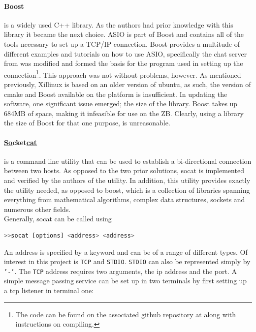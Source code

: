 \paragraph*{Boost}is a widely used C++ library.
As the authors had prior knowledge with this library it became the next choice.
ASIO is part of Boost and contains all of the tools necessary to set up a TCP/IP connection.
Boost provides a multitude of different examples and tutorials on how to use ASIO, specifically the chat server from \cite{boostchat} was modified and formed the basis for the program used in setting up the connection\footnote{The code can be found on the associated github repository at  along with instructions on compiling.}.
This approach was not without problems, however.
As mentioned previously, Xillinux is based on an older version of ubuntu, as such, the version of cmake and Boost available on the platform is insufficient.
In updating the software, one significant issue emerged; the size of the library.
Boost takes up 684MB of space, making it infeasible for use on the ZB.
Clearly, using a library the size of Boost for that one purpose, is unreasonable.

\paragraph*{\underline{So}cket\underline{cat}} is a command line utility that can be used to establish a bi-directional connection between two hosts.
As opposed to the two prior solutions, socat is implemented and verified by the authors of the utility.
In addition, this utility provides exactly the utility needed, as opposed to boost, which is a collection of libraries spanning everything from mathematical algorithms, complex data structures, sockets and numerous other fields.\\
Generally, socat can be called using
\begin{lstlisting}[language=bash]
>>socat [options] <address> <address>
\end{lstlisting}
An address is specified by a keyword and can be of a range of different types.
Of interest in this project is \texttt{TCP} and \texttt{STDIO}.
\texttt{STDIO} can also be represented simply by \texttt{'-'}.
The \texttt{TCP} address requires two arguments, the ip address and the port.
A simple message passing service can be set up in two terminals by first setting up a tcp listener in terminal one:

